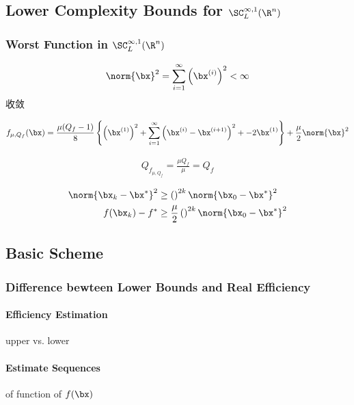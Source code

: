 \subsection{Lower Complexity Bounds for \texorpdfstring{$\SC_L^{\infty, 1}(\R^n)$}. }

\subsubsection{Worst Function in \texorpdfstring{$\SC_L^{\infty, 1}(\R^n)$}. }
\begin{align*}
    \norm{\bx}^2=\sum_{i=1}^\infty \left( \bx^{(i)} \right)^2 < \infty
\end{align*}
收敛


{ \tiny
\begin{align*}
    f_{\mu, Q_f}(\bx)=\frac{\mu(Q_f-1)}{8}\left\{\left( \bx^{(1)} \right)^2 +\sum_{i=1}^{\infty}\left( \bx^{(i)}-\bx^{(i+1)} \right)^2 + -2 \bx^{(1)} \right\}+\frac{\mu}{2}\norm{\bx}^2
\end{align*}
}

\begin{align*}
    Q_{f_{\mu, Q_f}}=\frac{\mu Q_{f}}{\mu}=Q_f
\end{align*}

\begin{theorem}
    \begin{align*}
        \norm{\bx_k-\bx^*}^2 &\ge \left(  \right)^{2k}\norm{\bx_0-\bx^*}^2\\
        f(\bx_k)-f^*&\ge \frac{\mu}{2} \left(  \right)^{2k}\norm{\bx_0-\bx^*}^2
    \end{align*}
\end{theorem}

\subsection{Basic Scheme}
\subsubsection{Difference bewteen Lower Bounds and Real Efficiency}
\paragraph{Efficiency Estimation}
upper vs. lower


\paragraph{Estimate Sequences}
\begin{definition}
    of function of $f(\bx)$
\end{definition}

